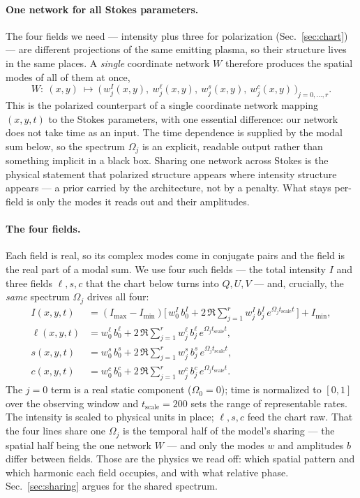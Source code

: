 \documentclass[11pt]{article}
\newcommand{\tsc}{t_{\mathrm{scale}}}
\begin{document}
\paragraph{One network for all Stokes parameters.}
The four fields we need --- intensity plus three for polarization
(Sec.~\ref{sec:chart}) --- are different projections of the same emitting plasma,
so their structure lives in the same places. A \emph{single} coordinate network
$W$ therefore produces the spatial modes of all of them at once,
\begin{equation}
  W:\ (x,y)\ \longmapsto\
  \bigl(\, w^{I}_j(x,y),\ w^{\ell}_j(x,y),\ w^{s}_j(x,y),\ w^{c}_j(x,y)\,\bigr)_{j=0,\dots,r}.
  \label{eq:net}
\end{equation}
This is the polarized counterpart of a
single coordinate network mapping $(x,y,t)$ to the Stokes parameters, with one
essential difference: our network does not take time as an input. The time
dependence is supplied by the modal sum below, so the spectrum $\Omega_j$ is an
explicit, readable output rather than something implicit in a black box. Sharing
one network across Stokes is the physical statement that polarized structure
appears where intensity structure appears --- a prior carried by the architecture,
not by a penalty. What stays per-field is only the modes it reads out and their
amplitudes.

\paragraph{The four fields.}
Each field is real, so its complex modes come in conjugate pairs and the field is
the real part of a modal sum. We use four such fields --- the total intensity $I$
and three fields $\ell,s,c$ that the chart below turns into $Q,U,V$ --- and,
crucially, the \emph{same} spectrum $\Omega_j$ drives all four:
\begin{align}
  I(x,y,t) &= (I_{\max}-I_{\min})\Big[\,w^{I}_0\,b^{I}_0
     + 2\,\Re\!\sum_{j=1}^{r} w^{I}_j\,b^{I}_j\,e^{\Omega_j \tsc t}\,\Big] + I_{\min},
     \label{eq:fieldI}\\[2pt]
  \ell(x,y,t) &= w^{\ell}_0\,b^{\ell}_0
     + 2\,\Re\!\sum_{j=1}^{r} w^{\ell}_j\,b^{\ell}_j\,e^{\Omega_j \tsc t},
     \label{eq:fieldq}\\[2pt]
  s(x,y,t) &= w^{s}_0\,b^{s}_0
     + 2\,\Re\!\sum_{j=1}^{r} w^{s}_j\,b^{s}_j\,e^{\Omega_j \tsc t},
     \label{eq:fieldu}\\[2pt]
  c(x,y,t) &= w^{c}_0\,b^{c}_0
     + 2\,\Re\!\sum_{j=1}^{r} w^{c}_j\,b^{c}_j\,e^{\Omega_j \tsc t}.
     \label{eq:fieldv}
\end{align}
The $j=0$ term is a real static component ($\Omega_0=0$); time is normalized to
$[0,1]$ over the observing window and $\tsc=200$ sets the range of representable
rates. The intensity is scaled to physical units in place; $\ell,s,c$ feed the chart
raw. That the four lines share one $\Omega_j$ is the temporal half of the model's
sharing --- the spatial half being the one network $W$ --- and only the modes $w$
and amplitudes $b$ differ between fields. Those are the physics we read off: which
spatial pattern and which harmonic each field occupies, and with what relative
phase. Sec.~\ref{sec:sharing} argues for the shared spectrum.
\end{document}
